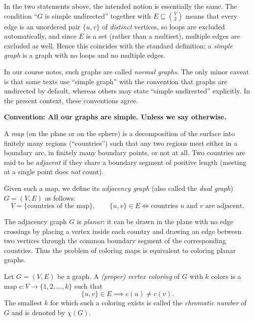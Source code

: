 \documentclass[11pt, a4paper]{ctexrep}
\begin{document}
\begin{remark}
    In the two statements above, the intended notion is essentially the same.
    The condition ``$G$ is simple undirected'' together with
    $E\subseteq \binom{V}{2}$ means that every edge is an unordered pair
    $\{u,v\}$ of \emph{distinct} vertices, so loops are excluded automatically,
    and since $E$ is a set (rather than a multiset), multiple edges are excluded
    as well. Hence this coincides with the standard definition: a \emph{simple
        graph} is a graph with no loops and no multiple edges.

    In our course notes, such graphs are called \emph{normal graphs}. The only
    minor caveat is that some texts use ``simple graph'' with the convention
    that graphs are undirected by default, whereas others may state
    ``simple undirected'' explicitly. In the present context, these conventions
    agree.
\end{remark}

\noindent \textbf{Convention: All our graphs are simple. Unless we say otherwise.}

\begin{definition}
    A \emph{map} (on the plane or on the sphere) is a decomposition of the surface
    into finitely many regions (``countries'') such that any two regions meet
    either in a boundary arc, in finitely many boundary points, or not at all.
    Two countries are said to be \emph{adjacent} if they share a boundary segment
    of positive length (meeting at a single point does \emph{not} count).

    Given such a map, we define its \emph{adjacency graph} (also called the
    \emph{dual graph}) $G=(V,E)$ as follows:
    \[
        V=\{\text{countries of the map}\},\qquad
        \{u,v\}\in E \iff \text{countries $u$ and $v$ are adjacent}.
    \]
\end{definition}

\begin{remark}[Planarity]
    The adjacency graph $G$ is \emph{planar}: it can be drawn in the plane with
    no edge crossings by placing a vertex inside each country and drawing an edge
    between two vertices through the common boundary segment of the corresponding
    countries. Thus the problem of coloring maps is equivalent to coloring planar
    graphs.
\end{remark}

\begin{definition}
    Let $G=(V,E)$ be a graph. A \emph{(proper) vertex coloring} of $G$ with $k$
    colors is a map $c:V\to\{1,2,\dots,k\}$ such that
    \[
        \{u,v\}\in E \implies c(u)\neq c(v).
    \]
    The smallest $k$ for which such a coloring exists is called the
    \emph{chromatic number} of $G$ and is denoted by $\chi(G)$.
\end{definition}
\end{document}
